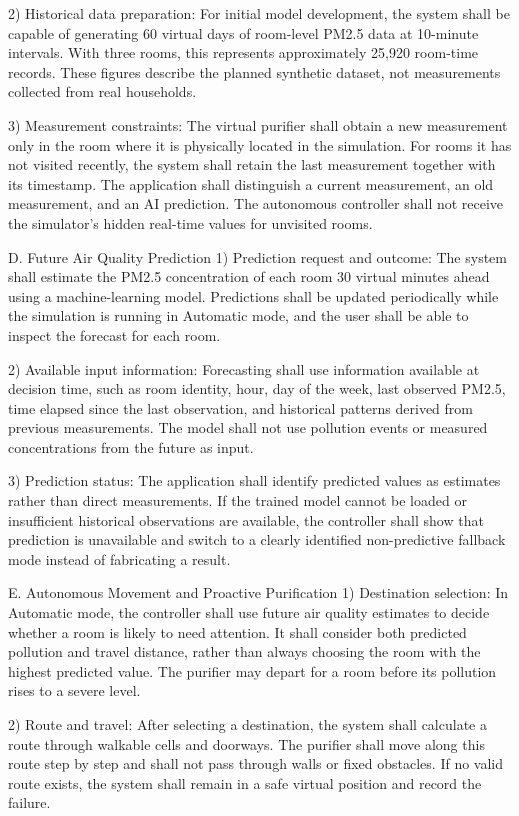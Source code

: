 2) Historical data preparation:
For initial model development, the system shall be capable of generating 60 virtual days of room-level PM2.5 data at 10-minute intervals. With three rooms, this represents approximately 25,920 room-time records. These figures describe the planned synthetic dataset, not measurements collected from real households.

3) Measurement constraints:
The virtual purifier shall obtain a new measurement only in the room where it is physically located in the simulation. For rooms it has not visited recently, the system shall retain the last measurement together with its timestamp. The application shall distinguish a current measurement, an old measurement, and an AI prediction. The autonomous controller shall not receive the simulator's hidden real-time values for unvisited rooms.

D. Future Air Quality Prediction
1) Prediction request and outcome:
The system shall estimate the PM2.5 concentration of each room 30 virtual minutes ahead using a machine-learning model. Predictions shall be updated periodically while the simulation is running in Automatic mode, and the user shall be able to inspect the forecast for each room.

2) Available input information:
Forecasting shall use information available at decision time, such as room identity, hour, day of the week, last observed PM2.5, time elapsed since the last observation, and historical patterns derived from previous measurements. The model shall not use pollution events or measured concentrations from the future as input.

3) Prediction status:
The application shall identify predicted values as estimates rather than direct measurements. If the trained model cannot be loaded or insufficient historical observations are available, the controller shall show that prediction is unavailable and switch to a clearly identified non-predictive fallback mode instead of fabricating a result.

E. Autonomous Movement and Proactive Purification
1) Destination selection:
In Automatic mode, the controller shall use future air quality estimates to decide whether a room is likely to need attention. It shall consider both predicted pollution and travel distance, rather than always choosing the room with the highest predicted value. The purifier may depart for a room before its pollution rises to a severe level.

2) Route and travel:
After selecting a destination, the system shall calculate a route through walkable cells and doorways. The purifier shall move along this route step by step and shall not pass through walls or fixed obstacles. If no valid route exists, the system shall remain in a safe virtual position and record the failure.

